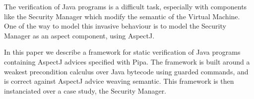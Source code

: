 The verification of Java programs is a difficult task, especially with
components like the Security Manager which modify the semantic of the
Virtual Machine.  One of the way to model this invasive behaviour is
to model the Security Manager as an aspect component, using AspectJ.

In this paper we describe a framework for static verification of Java
programs containing AspectJ advices specified with Pipa.  The
framework is built around a weakest precondition calculus over Java
bytecode using guarded commands, and is correct against AspectJ advice
weaving semantic.  This framework is then instanciated over a case
study, the Security Manager.

